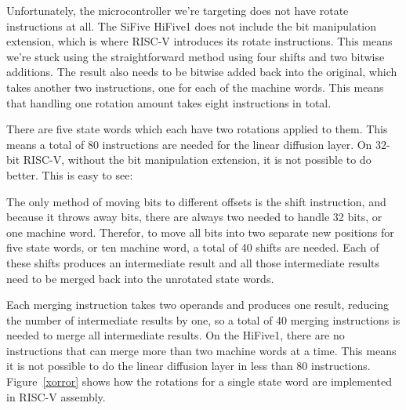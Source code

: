 Unfortunately, the microcontroller we're targeting does not have rotate
instructions at all. The SiFive HiFive1 does not include the bit manipulation
extension, which is where RISC-V introduces its rotate instructions. This means
we're stuck using the straightforward method using four shifts and two bitwise
additions. The result also needs to be bitwise added back into the original,
which takes another two instructions, one for each of the machine words. This
means that handling one rotation amount takes eight instructions in total.

There are five state words which each have two rotations applied to them. This
means a total of 80 instructions are needed for the linear diffusion layer. On
32-bit RISC-V, without the bit manipulation extension, it is not possible to do
better. This is easy to see:

The only method of moving bits to different offsets is the shift instruction,
and because it throws away bits, there are always two needed to handle 32 bits,
or one machine word. Therefor, to move all bits into two separate new positions
for five state words, or ten machine word, a total of 40 shifts are needed. Each
of these shifts produces an intermediate result and all those intermediate
results need to be merged back into the unrotated state words.

Each merging instruction takes two operands and produces one result, reducing
the number of intermediate results by one, so a total of 40 merging instructions
is needed to merge all intermediate results. On the HiFive1, there are no
instructions that can merge more than two machine words at a time. This means it
is not possible to do the linear diffusion layer in less than 80 instructions.
Figure~\ref{xorror} shows how the rotations for a single state word are
implemented in RISC-V assembly.

